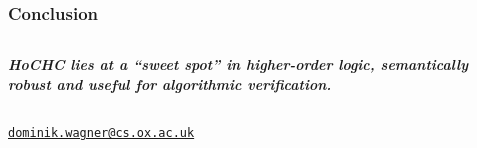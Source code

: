 \documentclass{beamer}
\begin{document}
\begin{frame}
  \frametitle{Conclusion}

  \vspace*{1cm}
  
  \begin{columns}
    \begin{column}{0.8\paperwidth}
      \textit{\textbf{\Large\color{lighterblue} 
    HoCHC lies at a \textbf{``sweet
      spot''} in higher-order logic, \emph{semantically robust} and
    \emph{useful} for \emph{algorithmic} verification.}}

    \end{column}
  \end{columns}

    
  {          \centering

          \vspace*{15mm}
          
          \insertauthor
          
          \vspace*{3mm}
          
          \href{mailto: dominik.wagner@cs.ox.ac.uk}{\texttt{dominik.wagner@cs.ox.ac.uk}}
      

        }
        
\end{frame}



\appendix
%         
%         
\end{document}
